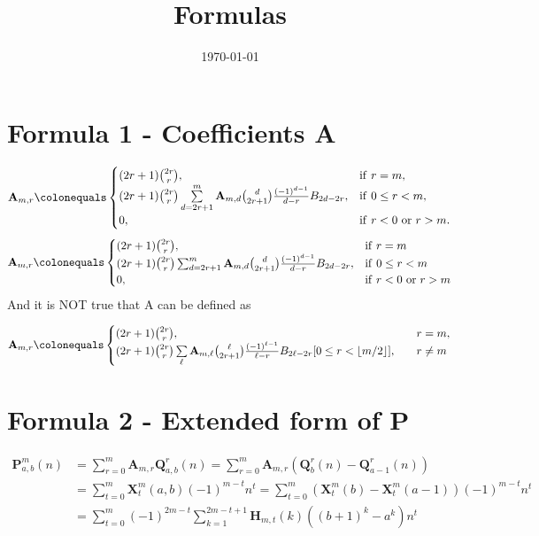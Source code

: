 \documentclass[12pt, letterpaper]{amsart}
\title{Formulas}
\date{\today}
\newcommand \coeffA [3][A]{\mathbf{#1}_{{#2},{#3}}}
\theoremstyle{definition}
\theoremstyle{remark}
\numberwithin{equation}{section}
\begin{document}
\maketitle
\section{Formula 1 - Coefficients A}
\begin{equation*}
\mathbf{A}_{m,r}\colonequals
\begin{cases}
(2r+1)\binom{2r}{r}, & \mathrm{if } \ r=m, \\
(2r+1)\binom{2r}{r} \sum\limits_{d=2r+1}^{m} \mathbf{A}_{m,d} \binom{d}{2r+1} \frac{(-1)^{d-1}}{d-r} B_{2d-2r}, & \mathrm{if } \ 0 \leq r < m, \\
0, & \mathrm{if } \ r<0 \ \mathrm{or } \ r>m.
\end{cases}
\end{equation*}
\begin{equation*}
\coeffA{m}{r} \colonequals
\begin{cases}
(2r+1)\binom{2r}{r}, & \mathrm{if } \ r=m \\
(2r+1)\binom{2r}{r} \sum_{d=2r+1}^{m} \coeffA{m}{d} \binom{d}{2r+1} \frac{(-1)^{d-1}}{d-r} B_{2d-2r}, & \mathrm{if } \ 0 \leq r < m \\
0, & \mathrm{if } \ r<0 \ \mathrm{or } \ r>m
\end{cases}
\end{equation*}
And it is NOT true that A can be defined as

\begin{equation*}
\mathbf{A}_{m,r}\colonequals
\begin{cases}
(2r+1)\binom{2r}{r}, &\quad r=m, \\
(2r+1)\binom{2r}{r} \sum\limits_{\ell} \mathbf{A}_{m,\ell} \binom{\ell}{2r+1} \frac{(-1)^{\ell-1}}{\ell-r} B_{2\ell-2r}[0\leq r< \lfloor m/2 \rfloor], &\quad r\neq m
\end{cases}
\end{equation*}
\section{Formula 2 - Extended form of P}
\begin{equation*}
\begin{split}
\mathbf{P}^{m}_{a,b}(n)
&=\sum\limits_{r=0}^{m}\mathbf{A}_{m,r}\mathbf{Q}^{r}_{a,b}(n)
= \sum\limits_{r=0}^{m}\mathbf{A}_{m,r}(\mathbf{Q}^{r}_{b}(n)-\mathbf{Q}^{r}_{a-1}(n))\\
&=\sum_{t=0}^m\mathbf{X}^{m}_{t}(a,b) (-1)^{m-t} n^t
= \sum_{t=0}^m (\mathbf{X}^{m}_{t}(b)-\mathbf{X}^{m}_{t}(a-1)) (-1)^{m-t} n^t\\
&=\sum_{t=0}^m (-1)^{2m-t} \sum_{k=1}^{2m-t+1} \mathbf{H}_{m,t}(k)((b+1)^k - a^k)n^t
\end{split}
\end{equation*}
\end{document}
